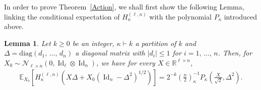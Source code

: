 \documentclass[10pt]{amsart}
\newtheorem{lemm}[theo]{Lemma}\newtheorem{prop}[theo]{Proposition}\newtheorem{coro}[theo]{Corollary}\newtheorem{conj}[theo]{Conjecture}
\theoremstyle{definition}\newtheorem{defi}[theo]{Definition}\newtheorem{rema}[theo]{Remark}\newtheorem{exam}[theo]{Example}\newtheorem{exem}[theo]{Example}\newtheorem{nota}[theo]{Notation}
\DeclareMathOperator{\Id}{Id}
\newcommand{\scN}{\mathscr{N}}
\newcommand{\diag}{\mathrm{diag}}
\newcommand{\R}{\mathbb{R}}
\newcommand{\EX}[2]{\mathbb{E}_{#1}\left[#2\right]}
\begin{document}
In order to prove Theorem~\ref{Action}, we shall first show the following Lemma, linking the conditional expectation of $H_{\kappa}^{(\ell,n)}$ with the polynomial $P_{\kappa}$ introduced above.

\begin{lemm}
Let $k\geq 0$ be an integer, $\kappa\vdash k$ a partition of $k$ and $\Delta=\diag(d_1,\,\ldots,\,d_n)$ a diagonal matrix with $|d_i|\leq 1$ for $i=1,\,\ldots,\,n$. Then, for $X_0 \sim \scN_{\ell\times n}(0,\Id_{\ell}\otimes \Id_n)$, we have for every $X \in \R^{\ell \times n}$,
\begin{gather}\label{Aux}
\EX{X_0}{H_{\kappa}^{(\ell,n)}\left(X\Delta+X_0\left(\Id_n-\Delta^2\right)^{1/2}\right) } = 2^{-k}\left(\frac{n}{2}\right)_{\kappa}^{-1} P_{\kappa}\left(\frac{X}{\sqrt{2}},\Delta^2\right).
\end{gather}
\end{lemm}
\end{document}
